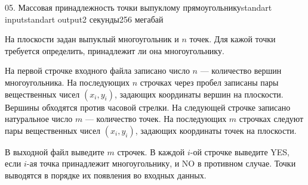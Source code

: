 \begin{problem}{05. Массовая принадлежность точки выпуклому прямоугольнику}{standart input}{standart output}{2 секунды}{256 мегабай}

На плоскости задан выпуклый многоугольник и $n$ точек. Для кажой точки требуется определить, принадлежит ли она многоугольнику.

\InputFile

На первой строчке входного файла записано число $n$ --- количество вершин многоугольника. На последующих $n$ строчках через пробел записаны пары вещественных чисел $(x_i, y_i)$, задающих координаты вершин на плоскости. Вершины обходятся против часовой стрелки. На следующей строчке записано натуральное число $m$ --- количество точек. На последующих $m$ строчках следуют пары вещественных чисел $(x_i, y_i)$, задающих координаты точек на плоскости.

\OutputFile

В выходной файл выведите $m$ строчек. В каждой $i$-ой строчке выведите YES, если $i$-ая точка принадлежит многоугольнику, и NO в противном случае. Точки выводятся в порядке их появления во входных данных.

\Examples

\begin{example}%
%
\end{example}

\end{problem}
